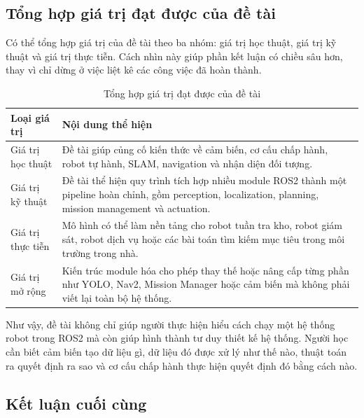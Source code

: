 \subsection{Tổng hợp giá trị đạt được của đề tài}
\label{subsec:project-values}

Có thể tổng hợp giá trị của đề tài theo ba nhóm: giá trị học thuật, giá trị kỹ thuật và giá trị thực tiễn. Cách nhìn này giúp phần kết luận có chiều sâu hơn, thay vì chỉ dừng ở việc liệt kê các công việc đã hoàn thành.

\begin{table}[H]
    \centering
    \caption{Tổng hợp giá trị đạt được của đề tài}
    \label{tab:project-values}
    \renewcommand{\arraystretch}{1.25}
    \small
    \begin{tabularx}{\textwidth}{|>{\raggedright\arraybackslash}p{}|>{\raggedright\arraybackslash}X|}
        \hline
        \textbf{Loại giá trị} & \textbf{Nội dung thể hiện} \\
        \hline
        Giá trị học thuật & Đề tài giúp củng cố kiến thức về cảm biến, cơ cấu chấp hành, robot tự hành, SLAM, navigation và nhận diện đối tượng. \\
        \hline
        Giá trị kỹ thuật & Đề tài thể hiện quy trình tích hợp nhiều module ROS2 thành một pipeline hoàn chỉnh, gồm perception, localization, planning, mission management và actuation. \\
        \hline
        Giá trị thực tiễn & Mô hình có thể làm nền tảng cho robot tuần tra kho, robot giám sát, robot dịch vụ hoặc các bài toán tìm kiếm mục tiêu trong môi trường trong nhà. \\
        \hline
        Giá trị mở rộng & Kiến trúc module hóa cho phép thay thế hoặc nâng cấp từng phần như YOLO, Nav2, Mission Manager hoặc cảm biến mà không phải viết lại toàn bộ hệ thống. \\
        \hline
    \end{tabularx}
\end{table}

Như vậy, đề tài không chỉ giúp người thực hiện hiểu cách chạy một hệ thống robot trong ROS2 mà còn giúp hình thành tư duy thiết kế hệ thống. Người học cần biết cảm biến tạo dữ liệu gì, dữ liệu đó được xử lý như thế nào, thuật toán ra quyết định ra sao và cơ cấu chấp hành thực hiện quyết định đó bằng cách nào.

\subsection{Kết luận cuối cùng}
\label{subsec:final-conclusion}

